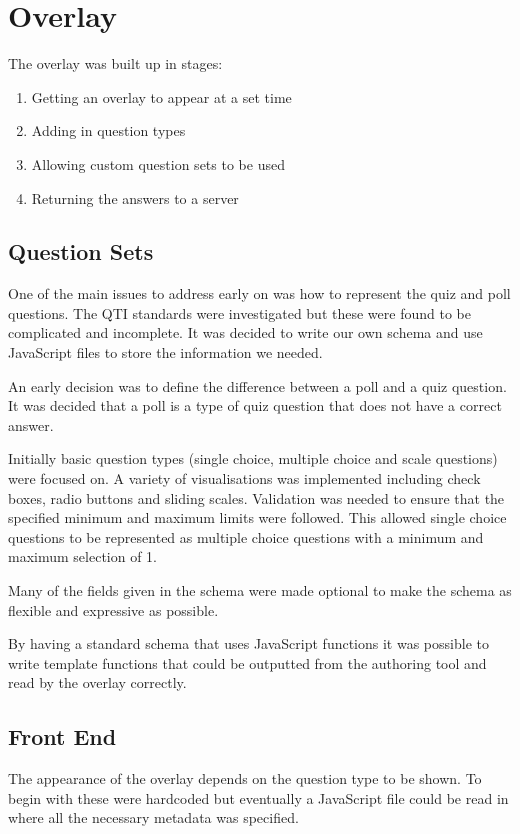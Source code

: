 \chapter{Overlay} \label{Chapter:Overlay}
The overlay was built up in stages:
\begin{enumerate}
\item Getting an overlay to appear at a set time
\item Adding in question types
\item Allowing custom question sets to be used
\item Returning the answers to a server
\end{enumerate}
\section{Question Sets} 
\label{Section:Question sets}
One of the main issues to address early on was how to represent the quiz and poll questions. The QTI standards were investigated but these were found to be complicated and incomplete. It was decided to write our own schema and use JavaScript files to store the information we needed. 

An early decision was to define the difference between a poll and a quiz question. It was decided that a poll is a type of quiz question that does not have a correct answer.

Initially basic question types (single choice, multiple choice and scale questions) were focused on. A variety of visualisations was implemented including check boxes, radio buttons and sliding scales. Validation was needed to ensure that the specified minimum and maximum limits were followed. This allowed single choice questions to be represented as multiple choice questions with a minimum and maximum selection of 1.

Many of the fields given in the schema were made optional to make the schema as flexible and expressive as possible. 

By having a standard schema that uses JavaScript functions it was possible to write template functions that could be outputted from the authoring tool and read by the overlay correctly.
\section{Front End} 
\label{Section:Front end}
The appearance of the overlay depends on the question type to be shown. To begin with these were hardcoded but eventually a JavaScript file could be read in where all the necessary metadata was specified.

